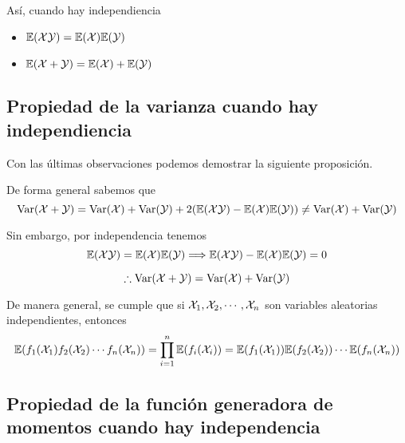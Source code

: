 

Así, cuando hay independiencia
\begin{itemize}
  \item $\mathbb{E}(\mathcal{X} \mathcal{Y}) = \mathbb{E}(\mathcal{X}) \mathbb{E}(\mathcal{Y})$
  \item $\mathbb{E}(\mathcal{X} + \mathcal{Y}) = \mathbb{E}(\mathcal{X}) + \mathbb{E}(\mathcal{Y})$
\end{itemize}

\subsection{Propiedad de la varianza cuando hay independiencia}
Con las últimas observaciones podemos demostrar la siguiente proposición.


\begin{myproof}
  De forma general sabemos que
  \[\operatorname{Var}(\mathcal{X} + \mathcal{Y}) = \operatorname{Var}(\mathcal{X}) + \operatorname{Var}(\mathcal{Y}) + 2(\mathbb{E}(\mathcal{X} \mathcal{Y}) - \mathbb{E}(\mathcal{X})\mathbb{E}(\mathcal{Y})) \neq \operatorname{Var}(\mathcal{X}) + \operatorname{Var}(\mathcal{Y})\]

  Sin embargo, por independencia tenemos
  \[\mathbb{E}(\mathcal{X} \mathcal{Y}) = \mathbb{E}(\mathcal{X})\mathbb{E}(\mathcal{Y}) \Longrightarrow \mathbb{E}(\mathcal{X} \mathcal{Y}) - \mathbb{E}(\mathcal{X})\mathbb{E}(\mathcal{Y}) = 0\]

  \[\therefore \operatorname{Var}(\mathcal{X} + \mathcal{Y}) = \operatorname{Var}(\mathcal{X}) + \operatorname{Var}(\mathcal{Y})\]
\end{myproof}

De manera general, se cumple que si $\mathcal{X}_1, \mathcal{X}_2, \cdots , \mathcal{X}_n$ son variables aleatorias independientes, entonces
\[
  \mathbb{E}(f_1(\mathcal{X}_1)f_2(\mathcal{X}_2) \cdots f_n(\mathcal{X}_n)) = \prod_{i = 1}^n \mathbb{E}(f_i(\mathcal{X}_i)) = \mathbb{E}(f_1(\mathcal{X}_1))\mathbb{E}(f_2(\mathcal{X}_2))\cdots \mathbb{E}(f_n(\mathcal{X}_n))
\]
\subsection{Propiedad de la función generadora de momentos cuando hay independencia}


